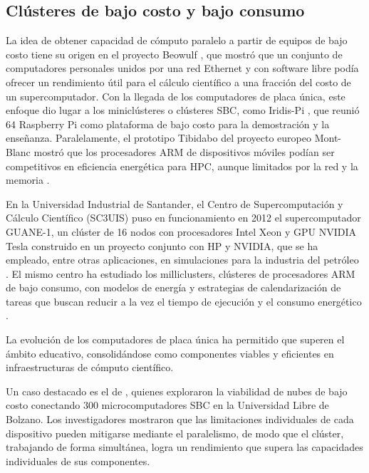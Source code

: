 \documentclass[12pt,oneside,spanish]{book}
\begin{document}
    \subsection{Clústeres de bajo costo y bajo consumo}

    La idea de obtener capacidad de cómputo paralelo a partir de equipos de bajo costo tiene su origen en el proyecto Beowulf \citep{sterling1995beowulf}, que mostró que un conjunto de computadores personales unidos por una red Ethernet y con software libre podía ofrecer un rendimiento útil para el cálculo científico a una fracción del costo de un supercomputador. Con la llegada de los computadores de placa única, este enfoque dio lugar a los miniclústeres o clústeres SBC, como Iridis-Pi \citep{cox2014iridis}, que reunió 64 Raspberry Pi como plataforma de bajo costo para la demostración y la enseñanza. Paralelamente, el prototipo Tibidabo del proyecto europeo Mont-Blanc mostró que los procesadores ARM de dispositivos móviles podían ser competitivos en eficiencia energética para HPC, aunque limitados por la red y la memoria \citep{rajovic2014tibidabo}.

    En la Universidad Industrial de Santander, el Centro de Supercomputación y Cálculo Científico (SC3UIS) puso en funcionamiento en 2012 el supercomputador GUANE-1, un clúster de 16 nodos con procesadores Intel Xeon y GPU NVIDIA Tesla construido en un proyecto conjunto con HP y NVIDIA, que se ha empleado, entre otras aplicaciones, en simulaciones para la industria del petróleo \citep{vanguardia2012guane}. El mismo centro ha estudiado los milliclusters, clústeres de procesadores ARM de bajo consumo, con modelos de energía y estrategias de calendarización de tareas que buscan reducir a la vez el tiempo de ejecución y el consumo energético \citep{florez2016milliclusters}.

    La evolución de los computadores de placa única ha permitido que superen el ámbito educativo, consolidándose como componentes viables y eficientes en infraestructuras de cómputo científico.
    
    Un caso destacado es el de \citet{abrahamsson2013}, quienes exploraron la viabilidad de nubes de bajo costo conectando 300 microcomputadores SBC en la Universidad Libre de Bolzano. Los investigadores mostraron que las limitaciones individuales de cada dispositivo pueden mitigarse mediante el paralelismo, de modo que el clúster, trabajando de forma simultánea, logra un rendimiento que supera las capacidades individuales de sus componentes.
    
\end{document}
